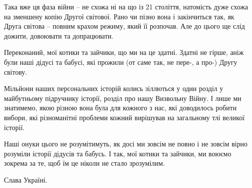 Така вже ця фаза війни – не схожа ні на що із 21 століття, натомість дуже схожа
на зменшену копію Другої світової. Рано чи пізно вона і закінчиться так, як
Друга світова – повним крахом режиму, який її розпочав. Але до цього ще слід
дожити, довоювати та допрацювати.

Переконаний, мої котики та зайчики, що ми на це здатні. Здатні не гірше, аніж
були наші дідусі та бабусі, які прожили (от саме так, не пере-, а про-) Другу
світову. 

Мільйони наших персональних історій колись зіллються у один розділ у
майбутньому підручнику історії, розділ про нашу Визвольну Війну. І лише ми
знатимемо, якою різною вона була для кожного з нас, які доводилось робити
вибори, які різноманітні проблеми кожний вирішував на загальному тлі великої
історії. 

Наші онуки цього не розумітимуть, як досі ми зовсім не повно і не зовсім вірно
розуміли історії дідусів та бабусь. І так, мої котики та зайчики, ми воюємо
зокрема за те, щоб їм це ніколи не стало зрозумілим.

Слава Україні.

